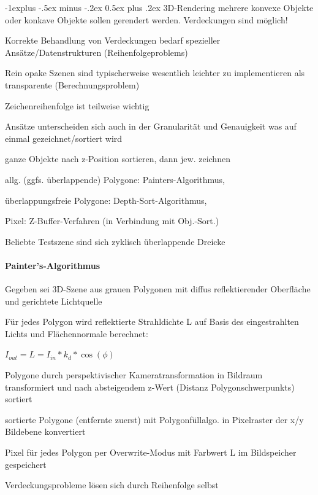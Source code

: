 \documentclass[landscape]{article}
\makeatletter
\renewcommand{\subsection}{\@startsection{subsection}{2}{0mm}%
                                {-1explus -.5ex minus -.2ex}%
                                {0.5ex plus .2ex}%
                                {\normalfont\normalsize\bfseries}}
\makeatother
\begin{document}
\begin{multicols}{3}
  \subsection{3D-Rendering}
  mehrere konvexe Objekte oder konkave Objekte sollen gerendert werden. Verdeckungen sind möglich!
  \begin{itemize*}
    \item Korrekte Behandlung von Verdeckungen bedarf spezieller Ansätze/Datenstrukturen (Reihenfolgeproblems)
    \item Rein opake Szenen sind typischerweise wesentlich leichter zu implementieren als transparente (Berechnungsproblem)
    \item Zeichenreihenfolge ist teilweise wichtig
    \item Ansätze unterscheiden sich auch in der Granularität und Genauigkeit was auf einmal gezeichnet/sortiert wird
    \item ganze Objekte nach z-Position sortieren, dann jew. zeichnen
    \item allg. (ggfs. überlappende) Polygone: Painters-Algorithmus,
    \item überlappungsfreie Polygone: Depth-Sort-Algorithmus,
    \item Pixel: Z-Buffer-Verfahren (in Verbindung mit Obj.-Sort.)
    \item Beliebte Testszene sind sich zyklisch überlappende Dreicke
  \end{itemize*}
  
  \paragraph{Painter’s-Algorithmus}
  \begin{itemize*}
    \item Gegeben sei 3D-Szene aus grauen Polygonen mit diffus reflektierender Oberfläche und gerichtete Lichtquelle
    \item Für jedes Polygon wird reflektierte Strahldichte L auf Basis des eingestrahlten Lichts und Flächennormale berechnet:
    \item $I_{out} = L = I_{in}* k_d * \cos(\phi)$
    \item Polygone durch perspektivischer Kameratransformation in Bildraum transformiert und nach absteigendem z-Wert (Distanz Polygonschwerpunkts) sortiert
    \item sortierte Polygone (entfernte zuerst) mit Polygonfüllalgo. in Pixelraster der x/y Bildebene konvertiert
    \item Pixel für jedes Polygon per Overwrite-Modus mit Farbwert L im Bildspeicher gespeichert
    \item Verdeckungsprobleme lösen sich durch Reihenfolge selbst
  \end{itemize*}
  

\end{multicols}
\end{document}
